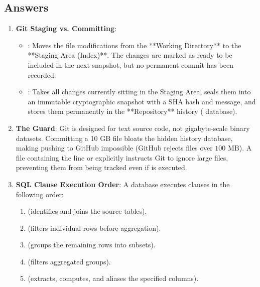 \subsection*{Answers}

\begin{enumerate}
    \item \textbf{Git Staging vs. Committing}:
    \begin{itemize}
        \item {}: Moves the file modifications from the **Working Directory** to the **Staging Area (Index)**. The changes are marked as ready to be included in the next snapshot, but no permanent commit has been recorded.
        \item {}: Takes all changes currently sitting in the Staging Area, seals them into an immutable cryptographic snapshot with a SHA hash and message, and stores them permanently in the **Repository** history ( database).
    \end{itemize}

    \item \textbf{The  Guard}:
    Git is designed for text source code, not gigabyte-scale binary datasets. Committing a 10 GB file bloats the hidden  history database, making pushing to GitHub impossible (GitHub rejects files over $100\text{ MB}$). 
    A  file containing the line  or  explicitly instructs Git to ignore large files, preventing them from being tracked even if  is executed.

    \item \textbf{SQL Clause Execution Order}:
    A database executes clauses in the following order:
    \begin{enumerate}
        \item \textbf{} (identifies and joins the source tables).
        \item \textbf{} (filters individual rows before aggregation).
        \item \textbf{} (groups the remaining rows into subsets).
        \item \textbf{} (filters aggregated groups).
        \item \textbf{} (extracts, computes, and aliases the specified columns).
    \end{enumerate}


\end{enumerate}
